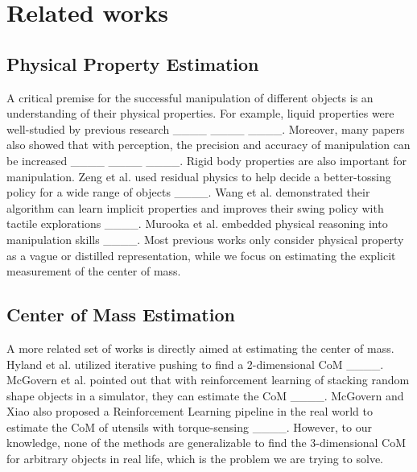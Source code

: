 \section{Related works}
\subsection{Physical Property Estimation}
A critical premise for the successful manipulation of different objects is an understanding of their physical properties. For example, liquid properties were well-studied by previous research ____ ____ ____. Moreover, many papers also showed that with perception, the precision and accuracy of manipulation can be increased ____ ____ ____. 
Rigid body properties are also important for manipulation. Zeng et al. used residual physics to help decide a better-tossing policy for a wide range of objects ____. Wang et al. demonstrated their algorithm can learn implicit properties and improves their swing policy with tactile explorations ____. Murooka et al. embedded physical reasoning into manipulation skills ____. Most previous works only consider physical property as a vague or distilled representation, while we focus on estimating the explicit measurement of the center of mass.  
\subsection{Center of Mass Estimation}
A more related set of works is directly aimed at estimating the center of mass. Hyland et al. utilized iterative pushing to find a 2-dimensional CoM ____. McGovern et al. pointed out that with reinforcement learning of stacking random shape objects in a simulator, they can estimate the CoM ____. McGovern and Xiao also proposed a Reinforcement Learning pipeline in the real world to estimate the CoM of utensils with torque-sensing ____. However, to our knowledge, none of the methods are generalizable to find the 3-dimensional CoM for arbitrary objects in real life, which is the problem we are trying to solve. 


